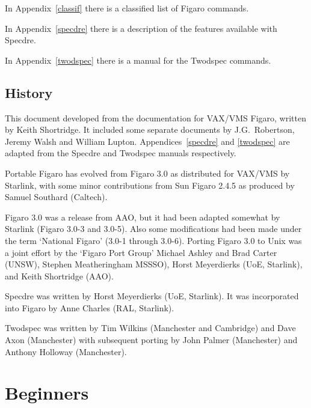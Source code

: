 \documentclass[11pt,twoside]{article}
\newcommand{\stardocinitials}  {SUN}
\newcommand{\stardocnumber}    {86.21}
\newcommand{\stardocname}{\stardocinitials /\stardocnumber}
\newcommand{\htmlref}[2]{#1}
\newcommand{\xlabel}[1]{}
\newcommand{\latorhtm}[2]{#1}
\newcommand{\latorhtm}[2]{#2}
\begin{document}
In \latorhtm{Appendix~\ref{classif}}{the \htmlref{Appendix}{classif}}
there is a classified list of Figaro commands.

In \latorhtm{Appendix~\ref{specdre}}{the \htmlref{Appendix}{specdre}}
there is a description of the features available with Specdre.

In \latorhtm{Appendix~\ref{twodspec}}{the \htmlref{Appendix}{twodspec}}
there is a manual for the Twodspec commands.

\subsection{\xlabel{history}History}

This document developed from the documentation for VAX/VMS Figaro,
written by Keith Shortridge. It included some separate documents by
J.G.~Robertson, Jeremy Walsh and William Lupton.
\latorhtm{Appendices~\ref{specdre} and \ref{twodspec}}
{The \htmlref{Specdre Appendix}{specdre} and the
\htmlref{Twodspec Appendix}{twodspec}}
are adapted from the Specdre and Twodspec manuals respectively.

Portable Figaro has evolved from Figaro 3.0 as distributed for VAX/VMS
by Starlink, with some minor contributions from Sun Figaro 2.4.5 as
produced by Samuel Southard (Caltech).

Figaro 3.0 was a release from AAO, but it had been adapted somewhat
by Starlink (Figaro 3.0-3 and 3.0-5). Also some modifications had
been made under the term `National Figaro' (3.0-1 through 3.0-6).
Porting Figaro 3.0 to Unix was a joint effort by the `Figaro Port
Group' Michael Ashley and Brad Carter (UNSW), Stephen Meatheringham
MSSSO), Horst Meyerdierks (UoE, Starlink), and Keith Shortridge (AAO).

Specdre was written by Horst Meyerdierks (UoE, Starlink).  It was
incorporated into Figaro by Anne Charles (RAL, Starlink).

Twodspec was written by Tim Wilkins (Manchester and Cambridge) and Dave
Axon (Manchester) with subsequent porting by John Palmer (Manchester) and
Anthony Holloway (Manchester).


\newpage %
\section{\xlabel{beginners}\label{beginners}Beginners}
\markboth{Beginners guide}{\stardocname}
\end{document}
